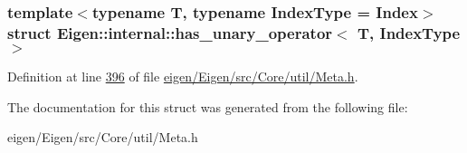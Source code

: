 \subsubsection*{template$<$typename T, typename Index\+Type = Index$>$\newline
struct Eigen\+::internal\+::has\+\_\+unary\+\_\+operator$<$ T, Index\+Type $>$}



Definition at line \hyperlink{eigen_2_eigen_2src_2_core_2util_2_meta_8h_source_l00396}{396} of file \hyperlink{eigen_2_eigen_2src_2_core_2util_2_meta_8h_source}{eigen/\+Eigen/src/\+Core/util/\+Meta.\+h}.



The documentation for this struct was generated from the following file\+:\begin{DoxyCompactItemize}
\item 
eigen/\+Eigen/src/\+Core/util/\+Meta.\+h\end{DoxyCompactItemize}
